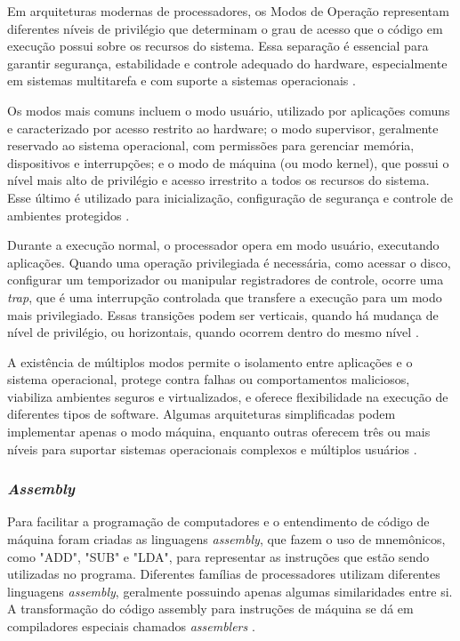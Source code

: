 \documentclass[
	12pt,				%
	openright,			%
	oneside,			%
	a4paper,			%
	english,			%
	french,				%
	spanish,			%
	brazil,				%
	]{abntex2}
\begin{document}

Em arquiteturas modernas de processadores, os Modos de Operação representam diferentes níveis de privilégio que determinam o grau de acesso que o código em execução possui sobre os recursos do sistema. Essa separação é essencial para garantir segurança, estabilidade e controle adequado do hardware, especialmente em sistemas multitarefa e com suporte a sistemas operacionais \cite[p.9]{risc-v_risc-v_2024-1}.

Os modos mais comuns incluem o modo usuário, utilizado por aplicações comuns e caracterizado por acesso restrito ao hardware; o modo supervisor, geralmente reservado ao sistema operacional, com permissões para gerenciar memória, dispositivos e interrupções; e o modo de máquina (ou modo kernel), que possui o nível mais alto de privilégio e acesso irrestrito a todos os recursos do sistema. Esse último é utilizado para inicialização, configuração de segurança e controle de ambientes protegidos \cite[p.9]{risc-v_risc-v_2024-1}.

Durante a execução normal, o processador opera em modo usuário, executando aplicações. Quando uma operação privilegiada é necessária, como acessar o disco, configurar um temporizador ou manipular registradores de controle, ocorre uma \textit{trap}, que é uma interrupção controlada que transfere a execução para um modo mais privilegiado. Essas transições podem ser verticais, quando há mudança de nível de privilégio, ou horizontais, quando ocorrem dentro do mesmo nível \cite[p.10]{risc-v_risc-v_2024-1}.

A existência de múltiplos modos permite o isolamento entre aplicações e o sistema operacional, protege contra falhas ou comportamentos maliciosos, viabiliza ambientes seguros e virtualizados, e oferece flexibilidade na execução de diferentes tipos de software. Algumas arquiteturas simplificadas podem implementar apenas o modo máquina, enquanto outras oferecem três ou mais níveis para suportar sistemas operacionais complexos e múltiplos usuários \cite[p.10]{risc-v_risc-v_2024-1}.

\subsubsection{\textit{Assembly}}
Para facilitar a programação de computadores e o entendimento de código de máquina foram criadas as linguagens \textit{assembly}, que fazem o uso de mnemônicos, como "ADD", "SUB" e "LDA", para representar as instruções que estão sendo utilizadas no programa. Diferentes famílias de processadores utilizam diferentes linguagens \textit{assembly}, geralmente possuindo apenas algumas similaridades entre si. A transformação do código assembly para instruções de máquina se dá em compiladores especiais chamados \textit{assemblers} \cite[p.6-7]{catsoulis_designing_2002}.
\end{document}
